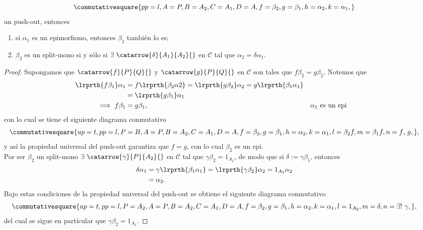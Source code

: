 \documentclass{article}
\begin{document}
\begin{enumerate}[label=\textbf{Ej \arabic*.}]
\begin{equation*}
		\commutativesquare{pp=l,A=P,B=A_2,C=A_1,D=A, f=\beta_2,g=\beta_1,h=\alpha_2,k=\alpha_1,}
	\end{equation*}	
	un push-out, entonces
		\begin{enumerate}
			\item si $\alpha_1$ es un epimorfismo, entonces $\beta_2$ también lo es;
			\item $\beta_2$ es un split-mono  si y sólo si $\exists\ \catarrow{\delta}{A_1}{A_2}{}$ en $\mathscr{C}$ tal que $\alpha_2=\delta\alpha_1$.
		\end{enumerate}
	\begin{proof}
		 Supongamos que $\catarrow{f}{P}{Q}{}$ y $\catarrow{g}{P}{Q}{}$ en $\mathscr{C}$ son tales que $f\beta_2=g\beta_2$. Notemos que
		\begin{align*}
			\lrprth{f\beta_1}\alpha_1&=f\lrprth{\beta_2\alpha 2}=\lrprth{g\beta_2 }\alpha_2=g\lrprth{\beta_1\alpha_1}\\
			&=\lrprth{g\beta_1}\alpha_1\\
			\implies f\beta_1 &=g\beta_1 , && \alpha_1\text{ es un epi}
		\end{align*}
		con lo cual se tiene el siguiente diagrama conmutativo
		\begin{equation*}
			\commutativesquare{up=t,pp=l,P=B,A=P,B=A_2,C=A_1,D=A,f=\beta_2,g=\beta_1,h=\alpha_2,k=\alpha_1,l=\beta_2 f,m=\beta_1 f,n=f\text{, }g,},
		\end{equation*}
		y así la propiedad universal del push-out garantiza que $f=g$, con lo cual $\beta_2$ es un epi.\\
		 Por ser $\beta_2$ un split-mono $\exists\ \catarrow{\gamma}{P}{A_2}{}$ en $\mathscr{C}$ tal que $\gamma\beta_2=1_{A_2}$, de modo que si $\delta:=\gamma\beta_1$, entonces
		\begin{align*}
			\delta\alpha_1&=\gamma\lrprth{\beta_1\alpha_1}=\lrprth{\gamma\beta_2}\alpha_2=1_{A_2}\alpha_2\\
			&=\alpha_2. 
		\end{align*}
		 Bajo estas condiciones de la propiedad universal del push-out se obtiene el siguiente diagrama conmutativo
		\begin{equation*}
			\commutativesquare{up=t,pp=l,P=A_2,A=P,B=A_2,C=A_1,D=A,f=\beta_2,g=\beta_1,h=\alpha_2,k=\alpha_1,l=1_{A_2},m=\delta,n=\exists !\ \gamma,},
		\end{equation*}
		del cual se sigue en partícular que $\gamma\beta_2=1_{A_2}$.
	\end{proof}

\end{enumerate}
\end{document}
